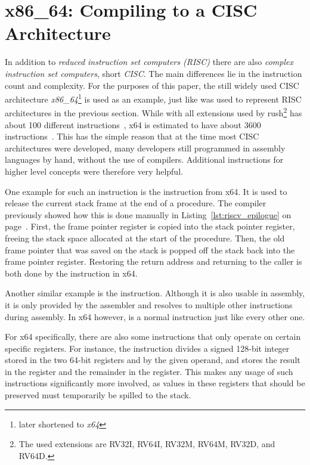 \newpage
\section{x86\_64: Compiling to a CISC Architecture}

In addition to \emph{reduced instruction set computers (RISC)} there are also \emph{complex instruction set computers}, short \emph{CISC}.
The main differences lie in the instruction count and complexity.
For the purposes of this paper, the still widely used CISC architecture \emph{x86\_64}\footnote{later shortened to \emph{x64}} is used as an example, just like \riscv{} was used to represent RISC architectures in the previous section.
While \riscv{} with all extensions used by rush\footnote{The used extensions are RV32I, RV64I, RV32M, RV64M, RV32D, and RV64D.} has about 100 different instructions~\cite[Chapter~24]{Waterman2019}, x64 is estimated to have about 3600 instructions~\cite{Rodgers2017}.
This has the simple reason that at the time most CISC architectures were developed, many developers still programmed in assembly languages by hand, without the use of compilers.
Additional instructions for higher level concepts were therefore very helpful.

One example for such an instruction is the  instruction from x64.
It is used to release the current stack frame at the end of a procedure.
The \riscv{} compiler previously showed how this is done manually in Listing~\ref{lst:riscv_epilogue} on page~\pageref{lst:riscv_epilogue}.
First, the frame pointer register is copied into the stack pointer register, freeing the stack space allocated at the start of the procedure.
Then, the old frame pointer that was saved on the stack is popped off the stack back into the frame pointer register.
Restoring the return address and returning to the caller is both done by the  instruction in x64.

Another similar example is the  instruction.
Although it is also usable in \riscv{} assembly, it is only provided by the assembler and resolves to multiple other \riscv{} instructions during assembly.
In x64 however,  is a normal instruction just like every other one.

For x64 specifically, there are also some instructions that only operate on certain specific registers.
For instance, the \label{x64_idiv} instruction divides a signed 128-bit integer stored in the two 64-bit registers  and  by the given operand, and stores the result in the  register and the remainder in the  register. This makes any usage of such instructions significantly more involved, as values in these registers that should be preserved must temporarily be spilled to the stack.

